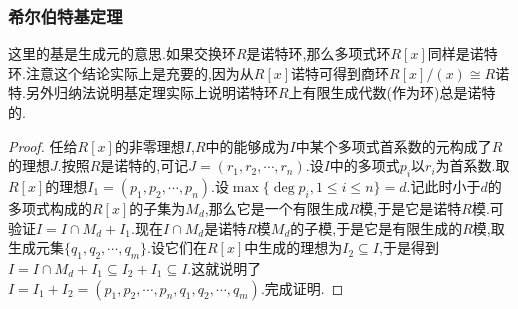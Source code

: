 \subsubsection{希尔伯特基定理}

这里的基是生成元的意思.如果交换环$R$是诺特环,那么多项式环$R[x]$同样是诺特环.注意这个结论实际上是充要的,因为从$R[x]$诺特可得到商环$R[x]/(x)\cong R$诺特.另外归纳法说明基定理实际上说明诺特环$R$上有限生成代数(作为环)总是诺特的.
\begin{proof}

任给$R[x]$的非零理想$I$,$R$中的能够成为$I$中某个多项式首系数的元构成了$R$的理想$J$.按照$R$是诺特的,可记$J=(r_1,r_2,\cdots,r_n)$.设$I$中的多项式$p_i$以$r_i$为首系数.取$R[x]$的理想$I_1=(p_1,p_2,\cdots,p_n)$.设$\max\{\deg p_i,1\le i\le n\}=d$.记此时小于$d$的多项式构成的$R[x]$的子集为$M_d$,那么它是一个有限生成$R$模,于是它是诺特$R$模.可验证$I=I\cap M_d+I_1$.现在$I\cap M_d$是诺特$R$模$M_d$的子模,于是它是有限生成的$R$模,取生成元集$\{q_1,q_2,\cdots,q_m\}$.设它们在$R[x]$中生成的理想为$I_2\subseteq I$,于是得到$I=I\cap M_d+I_1\subseteq I_2+I_1\subseteq I$.这就说明了$I=I_1+I_2=(p_1,p_2,\cdots,p_n,q_1,q_2,\cdots,q_m)$.完成证明.
\end{proof}

